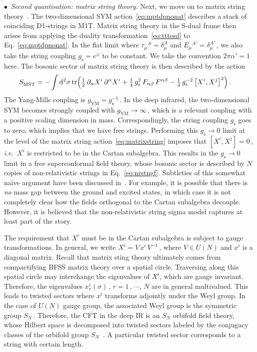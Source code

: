\documentclass[11pt]{article}
\newcommand{\be}{\begin{equation}}
\newcommand{\ee}{\end{equation}}
\newcommand{\p}{\partial}
\newcommand{\tr}{\text{tr}}
\renewcommand{\emph}[1]{\textit{#1}}
\newcommand{\wa}{\alpha}
\newcommand{\wb}{\beta}
\newcommand{\dd}{\mathrm{d}}
\begin{document}
\noindent $\bullet$~\emph{Second quantisation: matrix string theory.} 
Next, we move on to matrix string theory~\cite{Motl:1997th, Dijkgraaf:1997vv}. 
The two-dimensional SYM action~\eqref{eq:mptdpnonat} describes a stack of coinciding D1-strings in M1T. Matrix string theory in the S-dual frame then arises from applying the duality transformation~\eqref{eq:tttesd} to Eq.~\eqref{eq:mptdpnonat}. 
In the flat limit where $\tau^{}_\mu{}^A = \delta_\mu^A$ and $E^{}_\mu{}^{A'} = \delta_\mu^{A'}$\,, we also take the string coupling $g^{}_\text{s} = e^\varphi$ to be constant. We take the convention $2\pi\alpha'=1$ here. The bosonic sector of matrix string theory is then described by the action~\cite{Dijkgraaf:1997vv}
%
\be \label{eq:matrixstring}
\begin{split} 
S^{}_{\text{MST}} & = - \int \dd^2 \sigma \, \tr \Bigl(
  \tfrac{1}{2} \, \p_\alpha X^{i} \, \p^\alpha X^{i}
  + \tfrac{1}{4} \, g^2_\text{s} \, F_{\wa\wb} \, F^{\wa\wb} 
   - \tfrac{1}{4} \, g^{-2}_\text{s} \, \bigl[ X^{i}, X^{j} \bigl]^2
 \Bigr)\,. 
\end{split}
\ee
%
The Yang-Mills coupling is $g^{}_\text{YM} = g^{-1}_\text{s}$\,. In the deep infrared, the two-dimensional SYM becomes strongly coupled with $g^{}_\text{YM} \rightarrow \infty$\,, which is a relevant coupling with a positive scaling dimension in mass. Correspondingly, the string coupling $g^{}_\text{s}$ goes to zero, which implies that we have free strings. Performing this $g^{}_\text{s} \rightarrow 0$ limit at the level of the matrix string action~\eqref{eq:matrixstring} imposes that $[X^i, X^j] = 0$\,, \emph{i.e.}~$X^i$ 
is restricted to be in the Cartan subalgebra. This results in the $g^{}_\text{s} \rightarrow 0$ limit in a free superconformal field theory, whose bosonic sector is described by $N$ copies of non-relativistic strings in Eq.~\eqref{eq:nrstngf}. 
Subtleties of this somewhat na\"{i}ve argument have been discussed in~\cite{Harvey:1995tg}. For example, it is possible that there is \emph{no} mass gap between the ground and excited states, in which case it is not completely clear how the fields orthogonal to the Cartan subalgebra decouple. However, it is believed that the non-relativistic string sigma model captures at least part of the story. 

The requirement that $X^i$ must be in the Cartan subalgebra is subject to gauge transformations. In general, we write $X^i = V \, x^i \, V^{-1}$\,, where $V \in U(N)$ and $x^i$ is a diagonal matrix. Recall that matrix sting theory ultimately comes from compactifying BFSS matrix theory over a spatial circle. Traversing along this spatial circle may interchange the eigenvalues of $X^i$, which are gauge invariant. Therefore, the eigenvalues $x^i_r (\sigma)\,, \, r = 1\,, \, \cdots, \, N$ are in general multivalued. This leads to twisted sectors where $x^i$ transforms adjointly under the Weyl group. In the case of $U(N)$ gauge group, the associated Weyl group is the symmetric group $S_N$\,. Therefore, the CFT in the deep IR is an $S_N$ orbifold field theory, whose Hilbert space is decomposed into twisted sectors labeled by the conjugacy classes of the orbifold group $S_N$~\cite{Harvey:1995tg, Bershadsky:1995vm}. A particular twisted sector corresponds to a string with certain length. 
\end{document}
